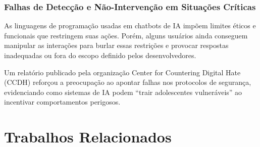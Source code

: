 \documentclass[12pt]{article}
\begin{document}

\subsubsection{Falhas de Detecção e Não-Intervenção em Situações Críticas}

As linguagens de programação usadas em chatbots de IA impõem limites éticos e funcionais que restringem suas ações. Porém, alguns usuários ainda conseguem manipular as interações para burlar essas restrições e provocar respostas inadequadas ou fora do escopo definido pelos desenvolvedores.


Um relatório publicado pela organização Center for Countering Digital Hate (CCDH) reforçou a preocupação ao apontar falhas nos protocolos de segurança, evidenciando como sistemas de IA podem “trair adolescentes vulneráveis” ao incentivar comportamentos perigosos. \cite{oglobo2025}



\section{Trabalhos Relacionados}
\end{document}

